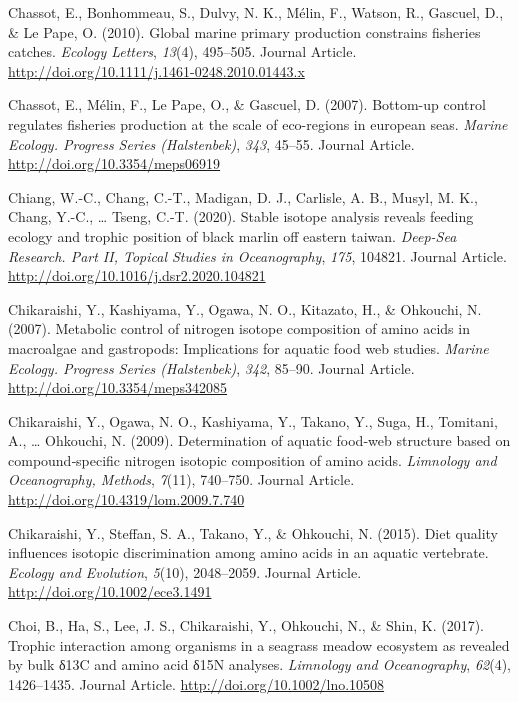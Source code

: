 \documentclass [11pt, proquest] {uwthesis}[2015/03/03]
\begin{document}
\hypertarget{ref-Chassot2010}{}
Chassot, E., Bonhommeau, S., Dulvy, N. K., Mélin, F., Watson, R.,
Gascuel, D., \& Le Pape, O. (2010). Global marine primary production
constrains fisheries catches. \emph{Ecology Letters}, \emph{13}(4),
495--505. Journal Article.
\url{http://doi.org/10.1111/j.1461-0248.2010.01443.x}

\hypertarget{ref-Chassot2007}{}
Chassot, E., Mélin, F., Le Pape, O., \& Gascuel, D. (2007). Bottom-up
control regulates fisheries production at the scale of eco-regions in
european seas. \emph{Marine Ecology. Progress Series (Halstenbek)},
\emph{343}, 45--55. Journal Article.
\url{http://doi.org/10.3354/meps06919}

\hypertarget{ref-Chiang2020}{}
Chiang, W.-C., Chang, C.-T., Madigan, D. J., Carlisle, A. B., Musyl, M.
K., Chang, Y.-C., \ldots{} Tseng, C.-T. (2020). Stable isotope analysis
reveals feeding ecology and trophic position of black marlin off eastern
taiwan. \emph{Deep-Sea Research. Part II, Topical Studies in
Oceanography}, \emph{175}, 104821. Journal Article.
\url{http://doi.org/10.1016/j.dsr2.2020.104821}

\hypertarget{ref-Chikaraishi2007}{}
Chikaraishi, Y., Kashiyama, Y., Ogawa, N. O., Kitazato, H., \& Ohkouchi,
N. (2007). Metabolic control of nitrogen isotope composition of amino
acids in macroalgae and gastropods: Implications for aquatic food web
studies. \emph{Marine Ecology. Progress Series (Halstenbek)},
\emph{342}, 85--90. Journal Article.
\url{http://doi.org/10.3354/meps342085}

\hypertarget{ref-Chikaraishi2009}{}
Chikaraishi, Y., Ogawa, N. O., Kashiyama, Y., Takano, Y., Suga, H.,
Tomitani, A., \ldots{} Ohkouchi, N. (2009). Determination of aquatic
food‐web structure based on compound‐specific nitrogen isotopic
composition of amino acids. \emph{Limnology and Oceanography, Methods},
\emph{7}(11), 740--750. Journal Article.
\url{http://doi.org/10.4319/lom.2009.7.740}

\hypertarget{ref-Chikaraishi2015}{}
Chikaraishi, Y., Steffan, S. A., Takano, Y., \& Ohkouchi, N. (2015).
Diet quality influences isotopic discrimination among amino acids in an
aquatic vertebrate. \emph{Ecology and Evolution}, \emph{5}(10),
2048--2059. Journal Article. \url{http://doi.org/10.1002/ece3.1491}

\hypertarget{ref-Choi2017}{}
Choi, B., Ha, S., Lee, J. S., Chikaraishi, Y., Ohkouchi, N., \& Shin, K.
(2017). Trophic interaction among organisms in a seagrass meadow
ecosystem as revealed by bulk δ13C and amino acid δ15N analyses.
\emph{Limnology and Oceanography}, \emph{62}(4), 1426--1435. Journal
Article. \url{http://doi.org/10.1002/lno.10508}
\end{document}
